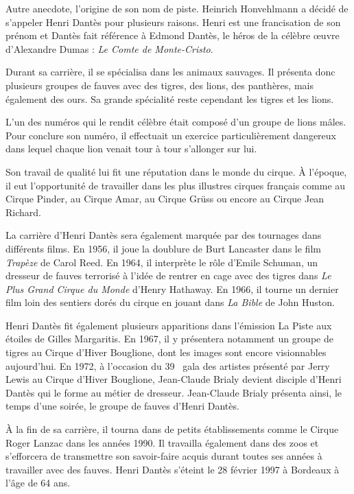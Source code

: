 Autre anecdote, l’origine de son nom de piste. Heinrich Honvehlmann a décidé de s’appeler Henri Dantès pour plusieurs raisons. Henri est une francisation de son prénom et Dantès fait référence à Edmond Dantès, le héros de la célèbre œuvre d'Alexandre Dumas : \textit{Le Comte de Monte-Cristo}.

Durant sa carrière, il se spécialisa dans les animaux sauvages. Il présenta donc plusieurs groupes de fauves avec des tigres, des lions, des panthères, mais également des ours. Sa grande spécialité reste cependant les tigres et les lions.

L’un des numéros qui le rendit célèbre était composé d’un groupe de lions mâles. Pour conclure son numéro, il effectuait un exercice particulièrement dangereux dans lequel chaque lion venait tour à tour s’allonger sur lui.

Son travail de qualité lui fit une réputation dans le monde du cirque. À l'époque, il eut l'opportunité de travailler dans les plus illustres cirques français comme au Cirque Pinder, au Cirque Amar, au Cirque Grüss ou encore au Cirque Jean Richard.

La carrière d’Henri Dantès sera également marquée par des tournages dans différents films. En 1956, il joue la doublure de Burt Lancaster dans le film \textit{Trapèze} de Carol Reed. En 1964, il interprète le rôle d’Emile Schuman, un dresseur de fauves terrorisé à l’idée de rentrer en cage avec des tigres dans \textit{Le Plus Grand Cirque du Monde} d'Henry Hathaway. En 1966, il tourne un dernier film loin des sentiers dorés du cirque en jouant dans \textit{La Bible} de John Huston.

Henri Dantès fit également plusieurs apparitions dans l’émission La Piste aux étoiles de Gilles Margaritis. En 1967, il y présentera notamment un groupe de tigres au Cirque d’Hiver Bouglione, dont les images sont encore visionnables aujourd’hui. En 1972, à l’occasion du 39\ieme~ gala des artistes présenté par Jerry Lewis au Cirque d’Hiver Bouglione, Jean-Claude Brialy devient disciple d'Henri Dantès qui le forme au métier de dresseur. Jean-Claude Brialy présenta ainsi, le temps d'une soirée, le groupe de fauves d’Henri Dantès.

À la fin de sa carrière, il tourna dans de petits établissements comme le Cirque Roger Lanzac dans les années 1990. Il travailla également dans des zoos et s’efforcera de transmettre son savoir-faire acquis durant toutes ses années à travailler avec des fauves. Henri Dantès s’éteint le 28 février 1997 à Bordeaux à l’âge de 64 ans.

